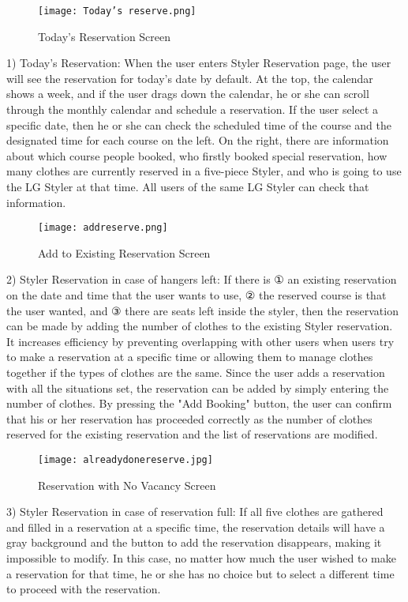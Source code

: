 \documentclass[conference]{IEEEtran}
\begin{document}
\begin{figure}[htbp]
\centerline{\texttt{[image: Today's reserve.png]}}
\label{fig}
\caption{Today's Reservation Screen}
\end{figure}
1) Today's Reservation: When the user enters Styler Reservation page, the user will see the reservation for today's date by default. At the top, the calendar shows a week, and if the user drags down the calendar, he or she can scroll through the monthly calendar and schedule a reservation.
If the user select a specific date, then he or she can check the scheduled time of the course and the designated time for each course on the left. On the right, there are information about which course people booked, who firstly booked special reservation, how many clothes are currently reserved in a five-piece Styler, and who is going to use the LG Styler at that time. All users of the same LG Styler can check that information.\\

\begin{figure}[htbp]
\centerline{\texttt{[image: addreserve.png]}}
\label{fig}
\caption{Add to Existing Reservation Screen}
\end{figure}
2) Styler Reservation in case of hangers left: If there is ① an existing reservation on the date and time that the user wants to use, ② the reserved course is that the user wanted, and ③ there are seats left inside the styler, then the reservation can be made by adding the number of clothes to the existing Styler reservation. It increases efficiency by preventing overlapping with other users when users try to make a reservation at a specific time or allowing them to manage clothes together if the types of clothes are the same.
Since the user adds a reservation with all the situations set, the reservation can be added by simply entering the number of clothes. By pressing the "Add Booking" button, the user can confirm that his or her reservation has proceeded correctly as the number of clothes reserved for the existing reservation and the list of reservations are modified.\\

\newpage
\begin{figure}[htbp]
\centerline{\texttt{[image: alreadydonereserve.jpg]}}
\label{fig}
\caption{Reservation with No Vacancy Screen}
\end{figure}
3) Styler Reservation in case of reservation full: If all five clothes are gathered and filled in a reservation at a specific time, the reservation details will have a gray background and the button to add the reservation disappears, making it impossible to modify. In this case, no matter how much the user wished to make a reservation for that time, he or she has no choice but to select a different time to proceed with the reservation.\\
\end{document}
